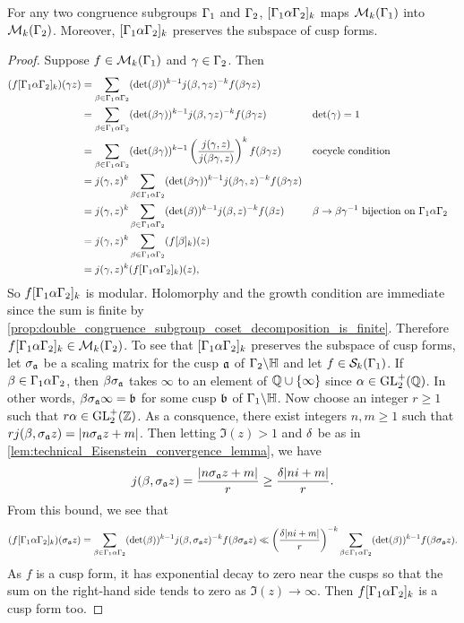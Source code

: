       \begin{proposition}
        For any two congruence subgroups $\Gamma_{1}$ and $\Gamma_{2}$, $[\Gamma_{1}\alpha\Gamma_{2}]_{k}$ maps $\mathcal{M}_{k}(\Gamma_{1})$ into $\mathcal{M}_{k}(\Gamma_{2})$. Moreover, $[\Gamma_{1}\alpha\Gamma_{2}]_{k}$ preserves the subspace of cusp forms.
      \end{proposition}
      \begin{proof}
        Suppose $f \in \mathcal{M}_{k}(\Gamma_{1})$ and $\gamma \in \Gamma_{2}$. Then
        \begin{align*}
          (f[\Gamma_{1}\alpha\Gamma_{2}]_{k})(\gamma z) &= \sum_{\beta \in \Gamma_{1}\alpha\Gamma_{2}}(\det(\beta))^{k-1}j(\beta,\gamma z)^{-k}f(\beta\gamma z) \\
          &= \sum_{\beta \in \Gamma_{1}\alpha\Gamma_{2}}(\det(\beta\gamma))^{k-1}j(\beta,\gamma z)^{-k}f(\beta\gamma z) && \text{$\det(\gamma) = 1$} \\
          &= \sum_{\beta \in \Gamma_{1}\alpha\Gamma_{2}}(\det(\beta\gamma))^{k-1}\left(\frac{j(\gamma,z)}{j(\beta\gamma,z)}\right)^{k}f(\beta\gamma z) && \text{cocycle condition} \\
          &= j(\gamma,z)^{k}\sum_{\beta \in \Gamma_{1}\alpha\Gamma_{2}}(\det(\beta\gamma))^{k-1}j(\beta\gamma,z)^{-k}f(\beta\gamma z) \\
          &= j(\gamma,z)^{k}\sum_{\beta \in \Gamma_{1}\alpha\Gamma_{2}}(\det(\beta))^{k-1}j(\beta,z)^{-k}f(\beta z) && \text{$\beta \to \beta\gamma^{-1}$ bijection on $\Gamma_{1}\alpha\Gamma_{2}$} \\
          &= j(\gamma,z)^{k}\sum_{\beta \in \Gamma_{1}\alpha\Gamma_{2}}(f[\beta]_{k})(z) \\
          &= j(\gamma,z)^{k}(f[\Gamma_{1}\alpha\Gamma_{2}]_{k})(z),
        \end{align*}
        So $f[\Gamma_{1}\alpha\Gamma_{2}]_{k}$ is modular. Holomorphy and the growth condition are immediate since the sum is finite by \cref{prop:double_congruence_subgroup_coset_decomposition_is_finite}. Therefore $f[\Gamma_{1}\alpha\Gamma_{2}]_{k} \in \mathcal{M}_{k}(\Gamma_{2})$. To see that $[\Gamma_{1}\alpha\Gamma_{2}]_{k}$ preserves the subspace of cusp forms, let $\sigma_{\mathfrak{a}}$ be a scaling matrix for the cusp $\mathfrak{a}$ of $\Gamma_{2}\backslash\mathbb{H}$ and let $f \in \mathcal{S}_{k}(\Gamma_{1})$. If $\beta \in \Gamma_{1}\alpha\Gamma_{2}$, then $\beta\sigma_{\mathfrak{a}}$ takes $\infty$ to an element of $\mathbb{Q} \cup \{\infty\}$ since $\alpha \in \mathrm{GL}_{2}^{+}(\mathbb{Q})$. In other words, $\beta\sigma_{\mathfrak{a}}\infty = \mathfrak{b}$ for some cusp $\mathfrak{b}$ of $\Gamma_{1}\backslash\mathbb{H}$. Now choose an integer $r \ge 1$ such that $r\alpha \in \mathrm{GL}_{2}^{+}(\mathbb{Z})$. As a consquence, there exist integers $n,m \ge 1$ such that $rj(\beta,\sigma_{\mathfrak{a}}z) = |n\sigma_{\mathfrak{a}}z+m|$. Then letting $\Im(z) > 1$ and $\delta$ be as in \cref{lem:technical_Eisenstein_convergence_lemma}, we have
        \[
          j(\beta,\sigma_{\mathfrak{a}}z) = \frac{|n\sigma_{\mathfrak{a}}z+m|}{r} \ge \frac{\delta|ni+m|}{r}.
        \]
        From this bound, we see that
        \[
          (f[\Gamma_{1}\alpha\Gamma_{2}]_{k})(\sigma_{\mathfrak{a}}z) = \sum_{\beta \in \Gamma_{1}\alpha\Gamma_{2}}(\det(\beta))^{k-1}j(\beta,\sigma_{\mathfrak{a}} z)^{-k}f(\beta\sigma_{\mathfrak{a}} z) \ll \left(\frac{\delta|ni+m|}{r}\right)^{-k}\sum_{\beta \in \Gamma_{1}\alpha\Gamma_{2}}(\det(\beta))^{k-1}f(\beta\sigma_{\mathfrak{a}} z).
        \]
        As $f$ is a cusp form, it has exponential decay to zero near the cusps so that the sum on the right-hand side tends to zero as $\Im(z) \to \infty$. Then $f[\Gamma_{1}\alpha\Gamma_{2}]_{k}$ is a cusp form too.
      \end{proof}

